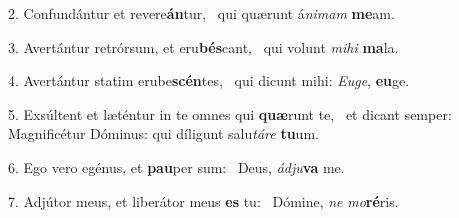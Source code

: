 2. Confundántur et revere\textbf{án}tur, \ast\  qui quærunt á\textit{ni}\textit{mam} \textbf{me}am.\

3. Avertántur retrórsum, et eru\textbf{bés}cant, \ast\  qui volunt \textit{mi}\textit{hi} \textbf{ma}la.\

4. Avertántur statim erube\textbf{scén}tes, \ast\  qui dicunt mihi: \textit{Eu}\textit{ge}, \textbf{eu}ge.\

5. Exsúltent et læténtur in te omnes qui \textbf{quæ}runt te, \ast\  et dicant semper: Magnificétur Dóminus: qui díligunt salu\textit{tá}\textit{re} \textbf{tu}um.\

6. Ego vero egénus, et \textbf{pau}per sum: \ast\  Deus, \textit{ád}\textit{ju}\textbf{va} me.\

7. Adjútor meus, et liberátor meus \textbf{es} tu: \ast\  Dómine, \textit{ne} \textit{mo}\textbf{ré}ris.\

